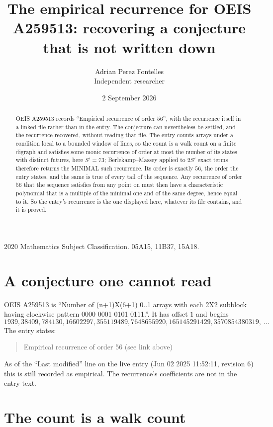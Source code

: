 \documentclass[11pt,a4paper]{article}
\title{The empirical recurrence for OEIS A259513: recovering a conjecture that is not written down}
\author{Adrian Perez Fontelles\\ \small Independent researcher}
\date{2 September 2026}
\theoremstyle{plain}
\theoremstyle{definition}
\begin{document}
\maketitle

\begin{abstract}
OEIS A259513 records ``Empirical recurrence of order $56$'', with the recurrence itself in a
linked file rather than in the entry. The conjecture can nevertheless be settled, and the
recurrence recovered, without reading that file. The entry counts arrays under a condition
local to a bounded window of lines, so the count is a walk count on a finite digraph and
satisfies some monic recurrence of order at most the number of its states with distinct
futures, here $S'=73$; Berlekamp--Massey applied to $2S'$ exact
terms therefore returns the MINIMAL such recurrence. Its order is exactly $56$, the order
the entry states, and the same is true of every tail of the sequence. Any recurrence of order
$56$ that the sequence satisfies from any point on must then have a characteristic
polynomial that is a multiple of the minimal one and of the same degree, hence equal to it. So
the entry's recurrence is the one displayed here, whatever its file contains, and it is
proved.
\end{abstract}

\noindent\small 2020 Mathematics Subject Classification. 05A15, 11B37, 15A18.\normalsize

\section{A conjecture one cannot read}

OEIS A259513 is ``Number of (n+1)X(6+1) 0..1 arrays with each 2X2 subblock having clockwise pattern 0000 0001 0101 0111.''. It has offset $1$ and begins
\[
1939, 38409, 784130, 16602297, 355119489, 7648655920, 165145291429, 3570854380319,\ \dots
\]
The entry states:
\begin{quote}
Empirical recurrence of order 56 (see link above)
\end{quote}
As of the ``Last modified'' line on the live entry (Jun 02 2025 11:52:11, revision 6) this is still
recorded as empirical. The recurrence's coefficients are not in the entry text.

\section{The count is a walk count}
\end{document}
